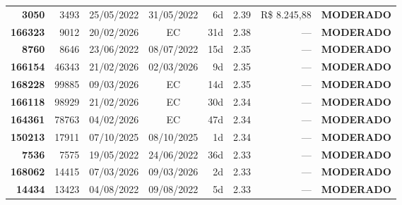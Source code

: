 \documentclass[a4paper,10pt]{article}
\begin{document}
\begin{center}
\begin{longtable}{>{\scriptsize}r>{\scriptsize}r>{\scriptsize}c>{\scriptsize}c>{\scriptsize}r>{\scriptsize}r>{\scriptsize}r>{\scriptsize}l}
\textcolor{anomyellow}{\textbf{3050}} & 3493 & 25/05/2022 & 31/05/2022 & 6d & \textcolor{anomyellow}{2.39} & R\$ 8.245,88 & \textcolor{anomyellow}{\textbf{MODERADO}} \\

\textcolor{anomyellow}{\textbf{166323}} & 9012 & 20/02/2026 & \textcolor{anomorange}{EC} & 31d & \textcolor{anomyellow}{2.38} & --- & \textcolor{anomyellow}{\textbf{MODERADO}} \\

\textcolor{anomyellow}{\textbf{8760}} & 8646 & 23/06/2022 & 08/07/2022 & 15d & \textcolor{anomyellow}{2.35} & --- & \textcolor{anomyellow}{\textbf{MODERADO}} \\

\textcolor{anomyellow}{\textbf{166154}} & 46343 & 21/02/2026 & 02/03/2026 & 9d & \textcolor{anomyellow}{2.35} & --- & \textcolor{anomyellow}{\textbf{MODERADO}} \\

\textcolor{anomyellow}{\textbf{168228}} & 99885 & 09/03/2026 & \textcolor{anomorange}{EC} & 14d & \textcolor{anomyellow}{2.35} & --- & \textcolor{anomyellow}{\textbf{MODERADO}} \\

\textcolor{anomyellow}{\textbf{166118}} & 98929 & 21/02/2026 & \textcolor{anomorange}{EC} & 30d & \textcolor{anomyellow}{2.34} & --- & \textcolor{anomyellow}{\textbf{MODERADO}} \\

\textcolor{anomyellow}{\textbf{164361}} & 78763 & 04/02/2026 & \textcolor{anomorange}{EC} & 47d & \textcolor{anomyellow}{2.34} & --- & \textcolor{anomyellow}{\textbf{MODERADO}} \\

\textcolor{anomyellow}{\textbf{150213}} & 17911 & 07/10/2025 & 08/10/2025 & 1d & \textcolor{anomyellow}{2.34} & --- & \textcolor{anomyellow}{\textbf{MODERADO}} \\

\textcolor{anomyellow}{\textbf{7536}} & 7575 & 19/05/2022 & 24/06/2022 & 36d & \textcolor{anomyellow}{2.33} & --- & \textcolor{anomyellow}{\textbf{MODERADO}} \\

\textcolor{anomyellow}{\textbf{168062}} & 14415 & 07/03/2026 & 09/03/2026 & 2d & \textcolor{anomyellow}{2.33} & --- & \textcolor{anomyellow}{\textbf{MODERADO}} \\

\textcolor{anomyellow}{\textbf{14434}} & 13423 & 04/08/2022 & 09/08/2022 & 5d & \textcolor{anomyellow}{2.33} & --- & \textcolor{anomyellow}{\textbf{MODERADO}} \\


\end{longtable}
\end{center}
\end{document}
